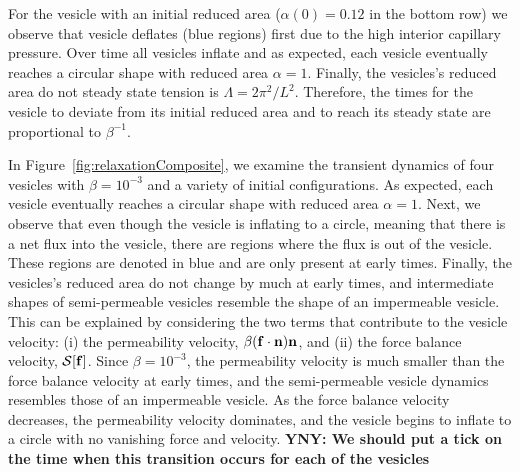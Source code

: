 \documentclass[9pt,twocolumn,twoside,lineno]{pnas-new}
\begin{document}
For the vesicle with an initial reduced area ($\alpha(0)=0.12$ in the bottom row) we observe that vesicle deflates (blue regions) first due to the high interior capillary pressure.  Over time
all vesicles inflate and as expected, each vesicle eventually
reaches a circular shape with reduced area $\alpha=1$. 
Finally, the vesicles's reduced area do not steady state tension is
$\Lambda = 2\pi^2/L^2$. Therefore, the times for
the vesicle to deviate from its initial reduced area and to reach its
steady state are proportional to $\beta^{-1}$. 

In Figure~\ref{fig:relaxationComposite}, we examine the transient
dynamics of four vesicles with $\beta = 10^{-3}$ and a variety of
initial configurations. As expected, each vesicle eventually
reaches a circular shape with reduced area $\alpha=1$. Next, we observe
that even though the vesicle is inflating to a circle, meaning that
there is a net flux into the vesicle, there are regions where the flux
is out of the vesicle. These regions are denoted in blue and are only
present at early times. Finally, the vesicles's reduced area do not
change by much at early times, and intermediate shapes of semi-permeable
vesicles resemble the shape of an impermeable vesicle. This can be
explained by considering the two terms that contribute to the vesicle
velocity: (i) the permeability velocity, $\beta(\mathbf{f} \cdot \mathbf{n}) \mathbf{n}$, and
(ii) the force balance velocity, $\mathcal{S}[\mathbf{f}]$. Since $\beta = 10^{-3}$,
the permeability velocity is much smaller than the force balance
velocity at early times, and the semi-permeable vesicle dynamics
resembles those of an impermeable vesicle. As the force balance velocity
decreases, the permeability velocity dominates, and the vesicle begins
to inflate to a circle with no vanishing force and velocity. {\bf YNY:
We should put a tick on the time when this transition occurs for each of
the vesicles}


\end{document}
